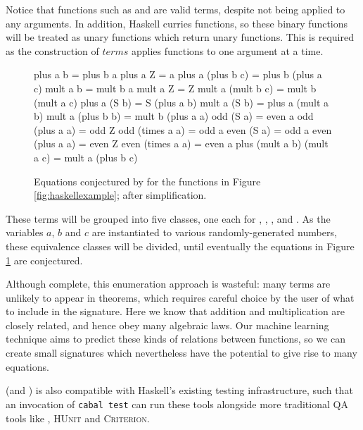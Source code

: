 Notice that functions such as  and  are valid terms, despite not being applied to any arguments. In addition, Haskell curries functions, so these binary functions will be treated as unary functions which return unary functions. This is required as the construction of $terms$ applies functions to one argument at a time.

\begin{figure}
  \begin{haskell}
                  plus a b = plus b a
                  plus a Z = a
         plus a (plus b c) = plus b (plus a c)
                  mult a b = mult b a
                  mult a Z = Z
         mult a (mult b c) = mult b (mult a c)
              plus a (S b) = S (plus a b)
              mult a (S b) = plus a (mult a b)
         mult a (plus b b) = mult b (plus a a)
                 odd (S a) = even a
            odd (plus a a) = odd Z
           odd (times a a) = odd a
                even (S a) = odd a
           even (plus a a) = even Z
          even (times a a) = even a
plus (mult a b) (mult a c) = mult a (plus b c)
  \end{haskell}
  \caption{Equations conjectured by \qspec{} for the functions in Figure \ref{fig:haskellexample}; after simplification.}
  \label{fig:qspecresult}
\end{figure}

These terms will be grouped into five classes, one each for , , ,  and . As the variables $a$, $b$ and $c$ are instantiated to various randomly-generated numbers, these equivalence classes will be divided, until eventually the equations in Figure \ref{fig:qspecresult} are conjectured.

Although complete, this enumeration approach is wasteful: many terms are unlikely to appear in theorems, which requires careful choice by the user of what to include in the signature. Here we know that addition and multiplication are closely related, and hence obey many algebraic laws. Our machine learning technique aims to predict these kinds of relations between functions, so we can create small signatures which nevertheless have the potential to give rise to many equations.

\qspec{} (and \hspec{}) is also compatible with Haskell's existing testing infrastructure, such that an invocation of \texttt{cabal test} can run these tools alongside more traditional QA tools like \qcheck{}, \textsc{HUnit} and \textsc{Criterion}.

